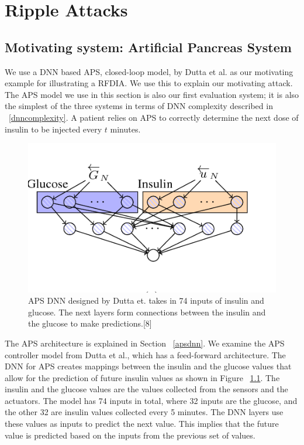 \chapter{Ripple Attacks}
\label{attack}

\section{Motivating system: Artificial Pancreas System}


We use a DNN based \ac{APS}, closed-loop model, by Dutta et al. \cite{10.1007/978-3-319-99429-1_11}  as our motivating example for illustrating a \ac{RFDIA}. 
We use this to explain our motivating attack. 
The \ac{APS} model we use in this section is also our first evaluation system; it is also the simplest of the three systems in terms of \ac{DNN} complexity described in ~\ref{dnncomplexity}.
A patient relies on  \ac{APS} to correctly determine the next dose of insulin to be injected every $t$ minutes. 

\begin{figure}
	\centering
	\includegraphics[width=0.7\linewidth, height=0.3\linewidth]{Images/APSDNN}
	\caption[APS DNN]{APS DNN designed by Dutta et. takes in 74 inputs of insulin and glucose. The next layers form connections between the insulin and the glucose to make predictions.[8]}
	\label{fig:apsdnn}
\end{figure}

The APS architecture is explained in Section ~\ref{apsdnn}. 
We examine the \ac{APS} controller model from Dutta et al., which has a feed-forward architecture. 
The DNN for APS creates mappings between the insulin and the glucose values that allow for the prediction of future insulin values as shown in Figure ~\ref{fig:apsdnn}. 
The insulin and the glucose values are the values collected from the sensors and the actuators. 
The model has 74 inputs in total, where 32 inputs are the glucose, and the other 32  are insulin values collected every 5 minutes.
 The DNN layers use these values as inputs to predict the next value. 
 This implies that the future value is predicted based on the inputs from the previous set of values. 


